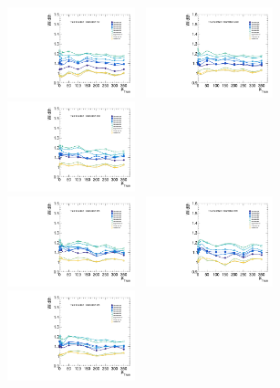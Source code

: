 \begin{figure}[!ht]
  \centering
  \includegraphics[width=0.33\textwidth]{Fig/BiasStudy/Linearity/HJpsiG/pull_width_linearity_TrueFunc0}~
  \includegraphics[width=0.33\textwidth]{Fig/BiasStudy/Linearity/HJpsiG/pull_width_linearity_TrueFunc1}~
  \includegraphics[width=0.33\textwidth]{Fig/BiasStudy/Linearity/HJpsiG/pull_width_linearity_TrueFunc2}\\
  \includegraphics[width=0.33\textwidth]{Fig/BiasStudy/Linearity/HJpsiG/pull_width_linearity_TrueFunc3}~
  \includegraphics[width=0.33\textwidth]{Fig/BiasStudy/Linearity/HJpsiG/pull_width_linearity_TrueFunc4}~
  \includegraphics[width=0.33\textwidth]{Fig/BiasStudy/Linearity/HJpsiG/pull_width_linearity_TrueFunc5}\\

\end{figure}
